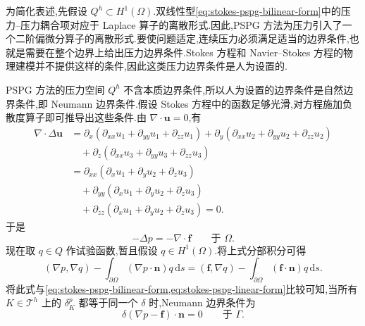 \begin{note}[人为设置的压力边界条件]\label{note:stokes-pspg-artificial-pressure-bc}
为简化表述,先假设 $Q^h\subset H^1(\Omega)$.双线性型\cref{eq:stokes-pspg-bilinear-form}中的压力--压力耦合项对应于 Laplace 算子的离散形式.因此,PSPG 方法为压力引入了一个二阶偏微分算子的离散形式.要使问题适定,连续压力必须满足适当的边界条件,也就是需要在整个边界上给出压力边界条件.Stokes 方程和 Navier--Stokes 方程的物理建模并不提供这样的条件,因此这类压力边界条件是人为设置的.

PSPG 方法的压力空间 $Q^h$ 不含本质边界条件,所以人为设置的边界条件是自然边界条件,即 Neumann 边界条件.假设 Stokes 方程中的函数足够光滑,对方程施加负散度算子即可推导出这些条件.由 $\nabla\cdot\bm{u}=0$,有
\begin{equation}\label{eq:stokes-pspg-divergence-laplacian-identity}
\begin{aligned}
 \nabla\cdot\Delta\bm{u}
 &=\partial_x(\partial_{xx}u_1+\partial_{yy}u_1+\partial_{zz}u_1)
   +\partial_y(\partial_{xx}u_2+\partial_{yy}u_2+\partial_{zz}u_2)\\
 &\quad+\partial_z(\partial_{xx}u_3+\partial_{yy}u_3+\partial_{zz}u_3)\\
 &=\partial_{xx}(\partial_xu_1+\partial_yu_2+\partial_zu_3)\\
 &\quad+\partial_{yy}(\partial_xu_1+\partial_yu_2+\partial_zu_3)\\
 &\quad+\partial_{zz}(\partial_xu_1+\partial_yu_2+\partial_zu_3)=0.
\end{aligned}
\end{equation}
于是
\[
 -\Delta p=-\nabla\cdot\bm{f}\qquad\text{于 }\Omega.
\]
现在取 $q\in Q$ 作试验函数,暂且假设 $q\in H^1(\Omega)$.将上式分部积分可得
\[
 (\nabla p,\nabla q)
  -\int_{\partial\Omega}(\nabla p\cdot\bm{n})q\,\mathrm{d}s
 =(\bm{f},\nabla q)
  -\int_{\partial\Omega}(\bm{f}\cdot\bm{n})q\,\mathrm{d}s.
\]
将此式与\cref{eq:stokes-pspg-bilinear-form,eq:stokes-pspg-linear-form}比较可知,当所有 $K\in\mathcal{T}^h$ 上的 $\delta_K^p$ 都等于同一个 $\delta$ 时,Neumann 边界条件为
\[
 \delta(\nabla p-\bm{f})\cdot\bm{n}=0
 \qquad\text{于 }\Gamma.
\]
\end{note}

